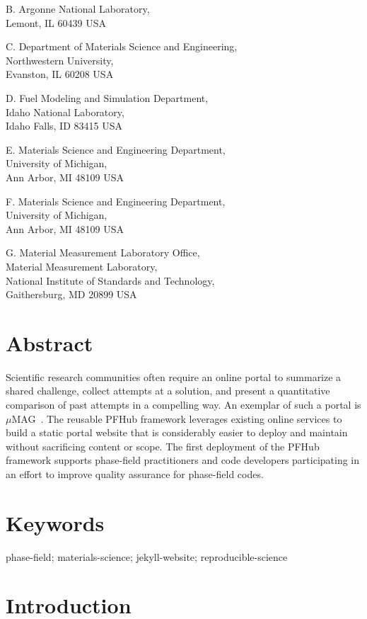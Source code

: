 \documentclass{jors}
\begin{document}
B. Argonne National Laboratory, \\
Lemont, IL 60439 USA

C. Department of Materials Science and Engineering, \\
Northwestern University, \\
Evanston, IL 60208 USA

D. Fuel Modeling and Simulation Department, \\
Idaho National Laboratory, \\
Idaho Falls, ID 83415 USA

E. Materials Science and Engineering Department, \\
University of Michigan, \\
Ann Arbor, MI 48109 USA

F. Materials Science and Engineering Department, \\
University of Michigan, \\
Ann Arbor, MI 48109 USA

G. Material Measurement Laboratory Office, \\
Material Measurement Laboratory, \\
National Institute of Standards and Technology,\\
Gaithersburg, MD 20899 USA

\section*{Abstract}

Scientific research communities often require an online portal to
summarize a shared challenge, collect attempts at a solution, and
present a quantitative comparison of past attempts in a compelling
way. An exemplar of such a portal is $\mu$MAG~\cite{mumag}. The
reusable PFHub framework leverages existing online services to build a
static portal website that is considerably easier to deploy and
maintain without sacrificing content or scope. The first deployment of
the PFHub framework supports phase-field practitioners and code
developers participating in an effort to improve quality assurance for
phase-field codes.

\section*{Keywords}

phase-field; materials-science; jekyll-website; reproducible-science

\section*{Introduction}
\end{document}
